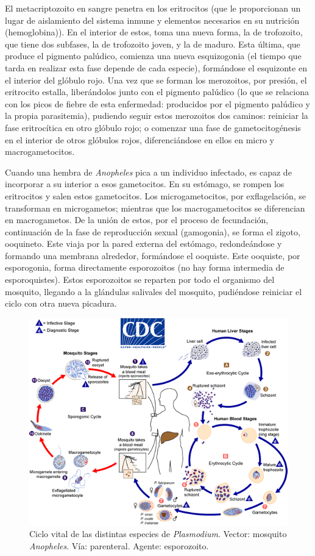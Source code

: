 El metacriptozoito en sangre penetra en los eritrocitos (que le proporcionan un lugar de aislamiento del sistema inmune y elementos necesarios en su nutrición (hemoglobina)). En el interior de estos, toma una nueva forma, la de trofozoito, que tiene dos subfases, la de trofozoito joven, y la de maduro. Esta última, que produce el pigmento palúdico, comienza una nueva esquizogonia (el tiempo que tarda en realizar esta fase depende de cada especie), formándose el esquizonte en el interior del glóbulo rojo. Una vez que se forman los merozoitos, por presión, el eritrocito estalla, liberándolos junto con el pigmento palúdico (lo que se relaciona con los picos de fiebre de esta enfermedad: producidos por el pigmento palúdico y la propia parasitemia), pudiendo seguir estos merozoitos dos caminos: reiniciar la fase eritrocítica en otro glóbulo rojo; o comenzar una fase de gametocitogénesis en el interior de otros glóbulos rojos, diferenciándose en ellos en micro y macrogametocitos.

Cuando una hembra de \textit{Anopheles} pica a un individuo infectado, es capaz de incorporar a su interior a esos gametocitos. En su estómago, se rompen los eritrocitos y salen estos gametocitos. Los microgametocitos, por exflagelación, se transforman en microgametos; mientras que los macrogametocitos se diferencian en macrogametos. De la unión de estos, por el proceso de fecundación, continuación de la fase de reproducción sexual (gamogonia), se forma el zigoto, ooquineto. Este viaja por la pared externa del estómago, redondeándose y formando una membrana alrededor, formándose el ooquiste. Este ooquiste, por esporogonia, forma directamente esporozoitos (no hay forma intermedia de esporoquistes). Estos esporozoitos se reparten por todo el organismo del mosquito, llegando a la glándulas salivales del mosquito, pudiéndose reiniciar el ciclo con otra nueva picadura.
\begin{figure}[H]
	\centering
	\includegraphics[width=0.85\columnwidth]{A.imagenes/ACV-BioSan-Parasit-PlasmodiumCbios}
	\caption[Ciclo vital de las distintas especies de \textit{Plasmodium}]{Ciclo vital de las distintas especies de \textit{Plasmodium}. Vector: mosquito \textit{Anopheles}. Vía: parenteral. Agente: esporozoito.}
\end{figure}
